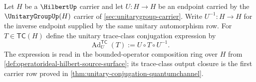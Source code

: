 \begin{definition}
\label{def:quantumchannel-unitary-conjugation-map}
Let $H$ be a $\HilbertUp$ carrier and let $U:H\to H$ be an endpoint carried by the $\UnitaryGroupUp(H)$ carrier of \autoref{sec:unitarygroup-carrier}. Write $U^{-1}:H\to H$ for the inverse endpoint supplied by the same unitary automorphism row. For $T\in\mathsf{TC}(H)$ define the unitary trace-class conjugation expression by
$$
\operatorname{Ad}^{\mathsf{TC}}_U(T):=U\circ T\circ U^{-1}.
$$
The expression is read in the bounded-operator composition ring over $H$ from \autoref{def:operatorideal-hilbert-source-surface}; its trace-class output closure is the first carrier row proved in \autoref{thm:unitary-conjugation-quantumchannel}.
\end{definition}


